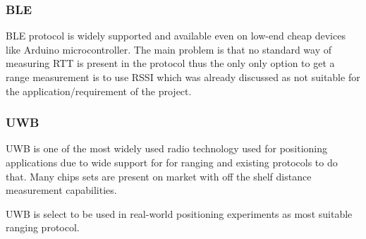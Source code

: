 \subsubsection{BLE}

BLE protocol is widely supported and available even on low-end cheap devices like Arduino microcontroller. The main problem is that no standard way of measuring RTT is present in the protocol thus the only only option to get a range measurement is to use RSSI which was already discussed as not suitable for the application/requirement of the project.

\subsubsection{UWB}

UWB is one of the most widely used radio technology used for positioning applications due to wide support for for ranging and existing protocols to do that. Many chips sets are present on market with off the shelf distance measurement capabilities.

UWB is select to be used in real-world positioning experiments as most suitable ranging protocol.


